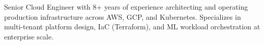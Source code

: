 
\begin{cvparagraph}
Senior Cloud Engineer with 8+ years of experience architecting and operating production infrastructure across AWS, GCP, and Kubernetes. Specializes in multi-tenant platform design, IaC (Terraform), and ML workload orchestration at enterprise scale.
\end{cvparagraph}
